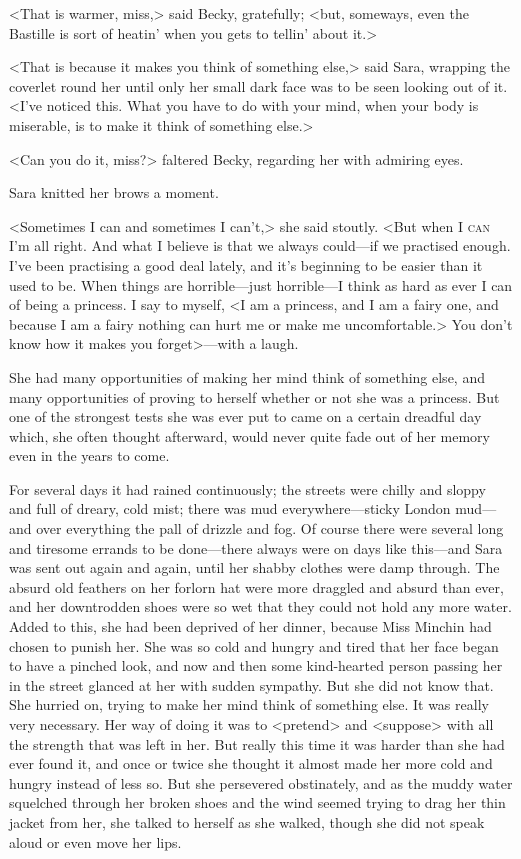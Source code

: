 <That is warmer, miss,> said Becky, gratefully; <but, someways, even the Bastille is sort of heatin' when you gets to tellin' about it.>

<That is because it makes you think of something else,> said Sara, wrapping the coverlet round her until only her small dark face was to be seen looking out of it. <I've noticed this. What you have to do with your mind, when your body is miserable, is to make it think of something else.>

<Can you do it, miss?> faltered Becky, regarding her with admiring eyes.

Sara knitted her brows a moment.

<Sometimes I can and sometimes I can't,> she said stoutly. <But when I \textsc{can} I'm all right. And what I believe is that we always could—if we practised enough. I've been practising a good deal lately, and it's beginning to be easier than it used to be. When things are horrible—just horrible—I think as hard as ever I can of being a princess. I say to myself, <I am a princess, and I am a fairy one, and because I am a fairy nothing can hurt me or make me uncomfortable.> You don't know how it makes you forget>—with a laugh.

She had many opportunities of making her mind think of something else, and many opportunities of proving to herself whether or not she was a princess. But one of the strongest tests she was ever put to came on a certain dreadful day which, she often thought afterward, would never quite fade out of her memory even in the years to come.

For several days it had rained continuously; the streets were chilly and sloppy and full of dreary, cold mist; there was mud everywhere—sticky London mud—and over everything the pall of drizzle and fog. Of course there were several long and tiresome errands to be done—there always were on days like this—and Sara was sent out again and again, until her shabby clothes were damp through. The absurd old feathers on her forlorn hat were more draggled and absurd than ever, and her downtrodden shoes were so wet that they could not hold any more water. Added to this, she had been deprived of her dinner, because Miss Minchin had chosen to punish her. She was so cold and hungry and tired that her face began to have a pinched look, and now and then some kind-hearted person passing her in the street glanced at her with sudden sympathy. But she did not know that. She hurried on, trying to make her mind think of something else. It was really very necessary. Her way of doing it was to <pretend> and <suppose> with all the strength that was left in her. But really this time it was harder than she had ever found it, and once or twice she thought it almost made her more cold and hungry instead of less so. But she persevered obstinately, and as the muddy water squelched through her broken shoes and the wind seemed trying to drag her thin jacket from her, she talked to herself as she walked, though she did not speak aloud or even move her lips.

